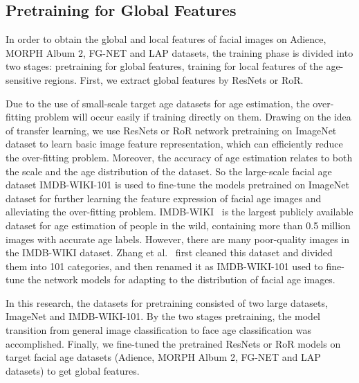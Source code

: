 \documentclass[journal]{IEEEtran}
\begin{document}
\subsection{Pretraining for Global Features}
In order to obtain the global and local features of facial images on Adience, MORPH Album 2, FG-NET and LAP datasets, the training phase is divided into two stages: pretraining for global features, training for local features of the age-sensitive regions. First, we extract global features by ResNets or RoR.
\par
Due to the use of small-scale target age datasets for age estimation, the over-fitting problem will occur easily if training directly on them. Drawing on the idea of transfer learning, we use ResNets or RoR network pretraining on ImageNet dataset to learn basic image feature representation, which can efficiently reduce the over-fitting problem. Moreover, the accuracy of age estimation relates to both the scale and the age distribution of the dataset. So the large-scale facial age dataset IMDB-WIKI-101 is used to fine-tune the models pretrained on ImageNet dataset for further learning the feature expression of facial age images and alleviating the over-fitting problem. IMDB-WIKI~\cite{ref-19} is the largest publicly available dataset for age estimation of people in the wild, containing more than 0.5 million images with accurate age labels. However, there are many poor-quality images in the IMDB-WIKI dataset. Zhang et al.~\cite{ref-22} first cleaned this dataset and divided them into 101 categories, and then renamed it as IMDB-WIKI-101 used to fine-tune the network models for adapting to the distribution of facial age images.
\par
In this research, the datasets for pretraining consisted of two large datasets, ImageNet and IMDB-WIKI-101. By the two stages pretraining, the model transition from general image classification to face age classification was accomplished. Finally, we fine-tuned the pretrained ResNets or RoR models on target facial age datasets (Adience, MORPH Album 2, FG-NET and LAP datasets) to get global features.
\end{document}
